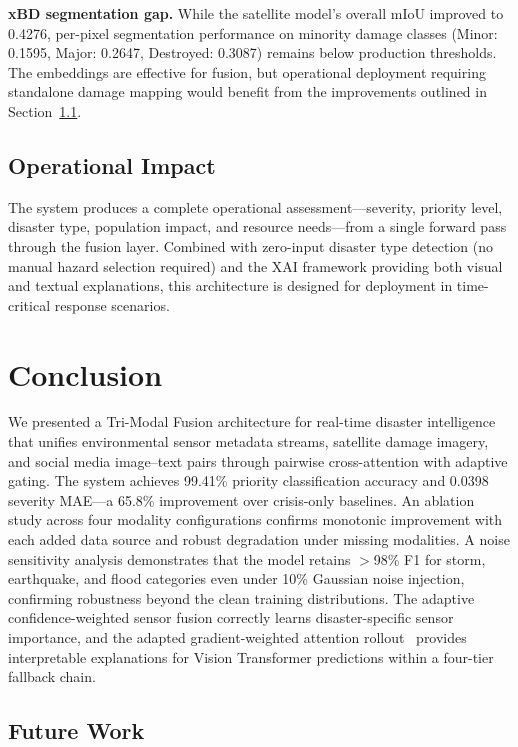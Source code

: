 \documentclass[journal]{IEEEtran}
\begin{document}
\textbf{xBD segmentation gap.} While the satellite model's overall mIoU improved to 0.4276, per-pixel segmentation performance on minority damage classes (Minor: 0.1595, Major: 0.2647, Destroyed: 0.3087) remains below production thresholds. The embeddings are effective for fusion, but operational deployment requiring standalone damage mapping would benefit from the improvements outlined in Section~\ref{sec:future}.

\subsection{Operational Impact}

The system produces a complete operational assessment---severity, priority level, disaster type, population impact, and resource needs---from a single forward pass through the fusion layer. Combined with zero-input disaster type detection (no manual hazard selection required) and the XAI framework providing both visual and textual explanations, this architecture is designed for deployment in time-critical response scenarios.

\section{Conclusion}

We presented a Tri-Modal Fusion architecture for real-time disaster intelligence that unifies environmental sensor metadata streams, satellite damage imagery, and social media image--text pairs through pairwise cross-attention with adaptive gating. The system achieves 99.41\% priority classification accuracy and 0.0398 severity MAE---a 65.8\% improvement over crisis-only baselines. An ablation study across four modality configurations confirms monotonic improvement with each added data source and robust degradation under missing modalities. A noise sensitivity analysis demonstrates that the model retains $>$98\% F1 for storm, earthquake, and flood categories even under 10\% Gaussian noise injection, confirming robustness beyond the clean training distributions. The adaptive confidence-weighted sensor fusion correctly learns disaster-specific sensor importance, and the adapted gradient-weighted attention rollout~\cite{chefer2021transformer} provides interpretable explanations for Vision Transformer predictions within a four-tier fallback chain.

\subsection{Future Work}
\label{sec:future}
\end{document}
